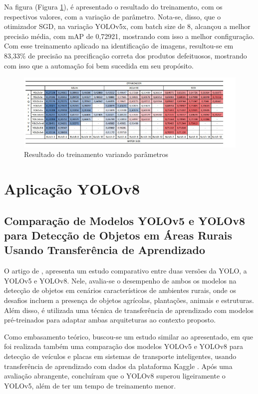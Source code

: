 Na figura (Figura \ref{fig:tabela-macha}), é apresentado o resultado do treinamento, com os respectivos valores, com a variação de parâmetro. Nota-se, disso, que o otimizador SGD, na variação YOLOv5x, com batch size de 8, alcançou a melhor precisão média, com mAP de 0,72921, mostrando com isso a melhor configuração. Com esse treinamento aplicado na identificação de imagens, resultou-se em 83,33\% de precisão na precificação correta dos produtos defeituosos, mostrando com isso que a automação foi bem sucedida em seu propósito.

\begin{figure}[!h]
    \center
    \begin{minipage}{0.9\linewidth}
        \center
        \captionsetup{justification=centering,margin=0.5cm,font=small}
        \includegraphics[width=0.7\linewidth]{img/cap3/tabela-mancha.jpeg}
        \caption{Resultado do treinamento variando parâmetros}
        \label{fig:tabela-macha}
    \end{minipage}
\end{figure}

\section{Aplicação YOLOv8}
\subsection{Comparação de Modelos YOLOv5 e YOLOv8 para Detecção de Objetos em Áreas Rurais Usando Transferência de Aprendizado}

O artigo de \cite{diascomparaccao}, apresenta um estudo comparativo entre duas versões da YOLO, a YOLOv5 e YOLOv8. Nele, avalia-se o desempenho de ambos os modelos na detecção de objetos em cenários característicos de ambientes rurais, onde os desafios incluem a presença de objetos agrícolas, plantações, animais e estruturas. Além disso, é utilizada uma técnica de transferência de aprendizado com modelos pré-treinados para adaptar ambas arquiteturas ao contexto proposto.

Como embasamento teórico, buscou-se um estudo similar ao apresentado, em que foi realizada também uma comparação dos modelos YOLOv5 e YOLOv8 para detecção de veículos e placas em sistemas de transporte inteligentes, usando transferência de aprendizado com dados da plataforma Kaggle \cite{afonso2023vehicle}. Após uma avaliação abrangente, concluíram que o YOLOv8 superou ligeiramente o YOLOv5, além de ter um tempo de treinamento menor.

